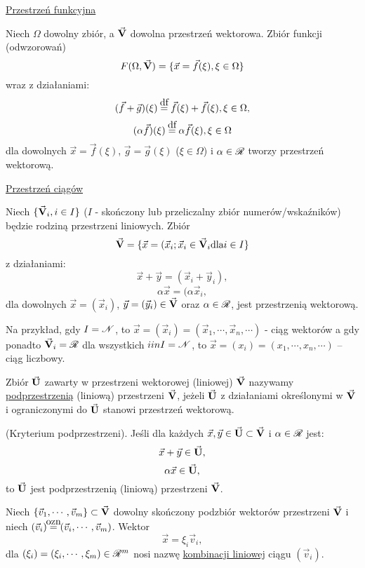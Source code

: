 \begin{example}
   \underline{Przestrzeń funkcyjna}
   
   Niech $\Omega$ dowolny zbiór, a $\vec{\mathbf{V}}$ dowolna przestrzeń wektorowa. Zbiór funkcji (odwzorowań)
   \[F(\Omega, \vec{\mathbf{V}}) = \{\vec{x}=\vec{f}(\xi), \xi\in\Omega\}\]
   wraz z działaniami:
   \[(\vec{f} + \vec{g})(\xi) \df \vec{f}(\xi) + \vec{f}(\xi), \xi \in \Omega,\]
   \[(\alpha \vec{f})(\xi) \df \alpha \vec{f}(\xi), \xi \in \Omega\]
   dla dowolnych $\vec{x} = \vec{f}(\xi)$, $\vec{g}=\vec{g}(\xi)$ ($\xi\in\Omega$) i $\alpha \in \mathscr{R}$ tworzy przestrzeń wektorową.
\end{example}

\begin{example}
  \underline{Przestrzeń ciągów}
  
  Niech $\{\vec{\mathbf{V}}_i, i \in I \}$ ($I$ - skończony lub przeliczalny zbiór numerów/wskaźników) będzie rodziną przestrzeni liniowych. Zbiór \[\vec{\mathbf{V}} = \{\vec{x} = (\vec{x}_i; \vec{x}_i \in \vec{\mathbf{V}}_i \text{dla} i \in I\}\]
  z działaniami:
  \[\vec{x}+\vec{y}=(\vec{x}_i+\vec{y}_i),\]
  \[\alpha \vec{x} = (\alpha \vec{x}_i,\]
  dla dowolnych $\vec{x} = (\vec{x}_i)$,   $\vec{y} = (\vec{y}_i) \in \vec{\mathbf{V}}$ oraz $\alpha \in \mathscr{R}$, jest przestrzenią wektorową.
  
  Na przykład, gdy $I = \mathscr{N}$, to $\vec{x} = (\vec{x}_i) = (\vec{x}_1,\cdots,\vec{x}_n,\cdots)$ - ciąg wektorów a gdy ponadto $\vec{\mathbf{V}}_i = \mathscr{R}$ dla wszystkich $i in I = \mathscr{N}$, to $\vec{x} = (x_i) = (x_1, \cdots, x_n, \cdots)$ -- ciąg liczbowy.
\end{example}

\begin{mydef}
   Zbiór $\vec{\mathbf{U}}$ zawarty w przestrzeni wektorowej (liniowej) $\vec{\mathbf{V}}$ nazywamy \underline{podprzestrzenią} (liniową) przestrzeni $\vec{\mathbf{V}}$, jeżeli $\vec{\mathbf{U}}$ z działaniami określonymi w $\vec{\mathbf{V}}$ i ograniczonymi do $\vec{\mathbf{U}}$ stanowi przestrzeń wektorową.
\end{mydef}

\begin{tw}
   (Kryterium podprzestrzeni). Jeśli dla każdych $\vec{x}, \vec{y} \in \vec{\mathbf{U}} \subset \vec{\mathbf{V}}$ i $\alpha \in \mathscr{R}$ jest:
   \[\vec{x} + \vec{y} \in \vec{\mathbf{U}},\]
   \[\alpha \vec{x} \in \vec{\mathbf{U}},\]
   to $\vec{\mathbf{U}}$ jest podprzestrzenią (liniową) przestrzeni $\vec{\mathbf{V}}$.
\end{tw}

\begin{mydef}
   Niech $\{\vec{v}_1, \cdots, \vec{v}_m\} \subset \vec{\mathbf{V}}$ dowolny skończony podzbiór wektorów przestrzeni $\vec{\mathbf{V}}$ i niech $(\vec{v}_i)\ozn (\vec{v}_i, \cdots, \vec{v}_m)$.
   Wektor
   \[\vec{x} = \xi_i \vec{v}_i,\]
   dla $(\xi_i) = (\xi_i, \cdots, \xi_m) \in \mathscr{R}^m$ nosi nazwę \underline{kombinacji liniowej} ciągu $(\vec{v}_i)$.
\end{mydef}

